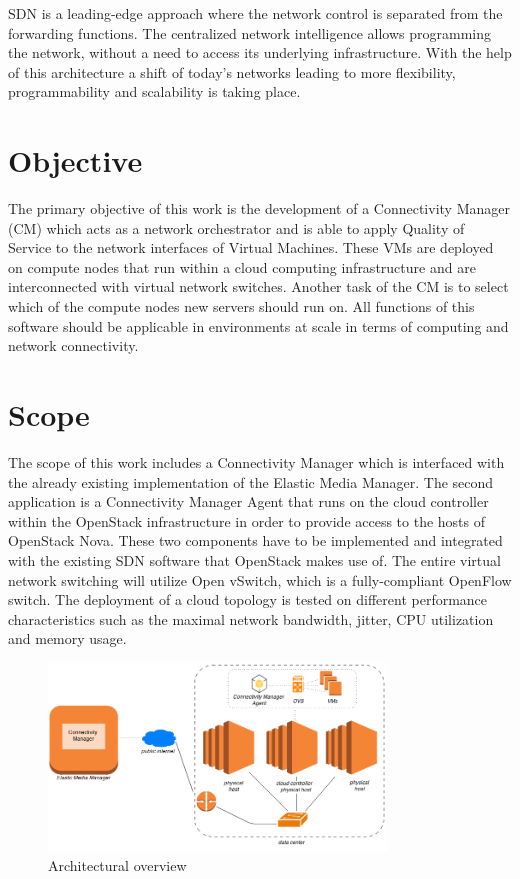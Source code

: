 SDN is a leading-edge approach where the network control is separated from the forwarding functions. The centralized network intelligence allows programming the network, without a need to access its underlying infrastructure. With the help of this architecture a shift of today's networks leading to more flexibility, programmability and scalability is taking place.

\section{Objective}

The primary objective of this work is the development of a Connectivity Manager (CM) which acts as a network orchestrator and is able to apply Quality of Service to the network interfaces of Virtual Machines. These VMs are deployed on compute nodes that run within a cloud computing infrastructure and are interconnected with virtual network switches. Another task of the CM is to select which of the compute nodes new servers should run on. All functions of this software should be applicable in environments at scale in terms of computing and network connectivity.

\section{Scope}
The scope of this work includes a Connectivity Manager which is interfaced with the already existing implementation of the Elastic Media Manager. The second application is a Connectivity Manager Agent that runs on the cloud controller within the OpenStack infrastructure in order to provide access to the hosts of OpenStack Nova. These two components have to be implemented and integrated with the existing SDN software that OpenStack makes use of. The entire virtual network switching will utilize Open vSwitch, which is a fully-compliant OpenFlow switch. The deployment of a cloud topology is tested on different performance characteristics such as the maximal network bandwidth, jitter, CPU utilization and memory usage.


\begin{figure}[H]
\centering

\includegraphics[width=0.8\textwidth]{images/design/scope_architecture.png}

\caption{Architectural overview}
\end{figure}

